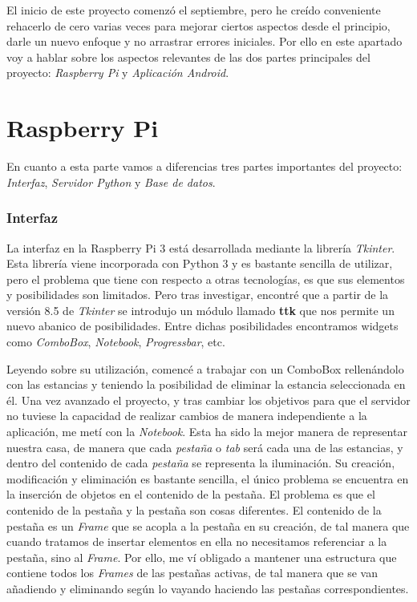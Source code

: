 
El inicio de este proyecto comenzó el septiembre, pero he creído conveniente rehacerlo de cero varias veces para mejorar ciertos aspectos desde el principio, darle un nuevo enfoque y no arrastrar errores iniciales. Por ello en este apartado voy a hablar sobre los aspectos relevantes de las dos partes principales del proyecto: \textit{Raspberry Pi} y \textit{Aplicación Android}.

\section{Raspberry Pi}

En cuanto a esta parte vamos a diferencias tres partes importantes del proyecto: \textit{Interfaz}, \textit{Servidor Python} y \textit{Base de datos}.

\subsubsection{Interfaz}

La interfaz en la Raspberry Pi 3 está desarrollada mediante la librería \textit{Tkinter}. Esta librería viene incorporada con Python 3 y es bastante sencilla de utilizar, pero el problema que tiene con respecto a otras tecnologías, es que sus elementos y posibilidades son limitados. Pero tras investigar, encontré que a partir de la versión 8.5 de \textit{Tkinter} se introdujo un módulo llamado \textbf{ttk} que nos permite un nuevo abanico de posibilidades. Entre dichas posibilidades encontramos widgets como \textit{ComboBox}, \textit{Notebook}, \textit{Progressbar}, etc. 

Leyendo sobre su utilización, comencé a trabajar con un ComboBox rellenándolo con las estancias y teniendo la posibilidad de eliminar la estancia seleccionada en él. Una vez avanzado el proyecto, y tras cambiar los objetivos para que el servidor no tuviese la capacidad de realizar cambios de manera independiente a la aplicación, me metí con la \textit{Notebook}. Esta ha sido la mejor manera de representar nuestra casa, de manera que cada \textit{pestaña} o \textit{tab} será cada una de las estancias, y dentro del contenido de cada \textit{pestaña} se representa la iluminación. Su creación, modificación y eliminación es bastante sencilla, el único problema se encuentra en la inserción de objetos en el contenido de la pestaña. El problema es que el contenido de la pestaña y la pestaña son cosas diferentes. El contenido de la pestaña es un \textit{Frame} que se acopla a la pestaña en su creación, de tal manera que cuando tratamos de insertar elementos en ella no necesitamos referenciar a la pestaña, sino al \textit{Frame}. Por ello, me ví obligado a mantener una estructura que contiene todos los \textit{Frames} de las pestañas activas, de tal manera que se van añadiendo y eliminando según lo vayando haciendo las pestañas correspondientes.

